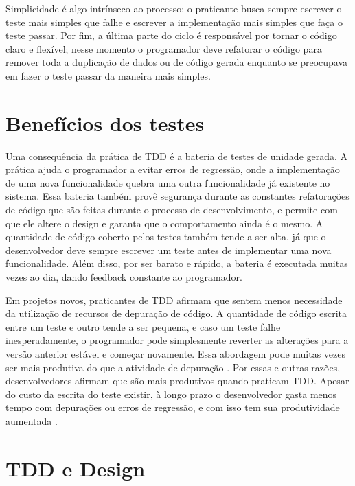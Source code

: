Simplicidade é algo intrínseco ao processo; o praticante
busca sempre escrever o teste mais simples que falhe e escrever a implementação mais simples
que faça o teste passar. Por fim, a última parte do ciclo é responsável por
tornar o código claro e flexível; nesse momento o programador deve
refatorar o código para remover toda a duplicação de dados ou de código gerada enquanto 
se preocupava em fazer o teste passar da maneira mais simples.

\section{Benefícios dos testes}

Uma consequência da prática de TDD é a bateria de testes de unidade gerada.
A prática ajuda o programador a evitar erros de regressão, onde a implementação de
uma nova funcionalidade quebra uma outra funcionalidade já existente no sistema.
Essa bateria também provê segurança durante as
constantes refatorações de código que são feitas durante o processo de
desenvolvimento, e permite com que ele altere o design e garanta que o
comportamento ainda é o mesmo. 
A quantidade de código coberto pelos testes também tende a ser alta, já que o
desenvolvedor deve sempre escrever um teste antes de implementar uma nova
funcionalidade. Além disso, por ser barato e rápido, a bateria é executada
muitas vezes ao dia, dando feedback constante ao programador.

Em projetos novos, praticantes de TDD afirmam que sentem menos necessidade da
utilização de recursos de depuração de código. A quantidade de código
escrita entre um teste e outro tende a ser pequena, e caso um teste falhe
inesperadamente, o programador pode simplesmente reverter as alterações para a 
versão anterior estável e começar novamente. Essa abordagem pode muitas vezes
ser mais produtiva do que a atividade de depuração 
\cite{janzen-arch-improvement}. Por essas e outras razões, desenvolvedores afirmam 
que são mais produtivos quando praticam TDD. Apesar do custo da escrita do teste
existir, à longo prazo o desenvolvedor gasta menos tempo com depurações ou 
erros de regressão, e com isso tem sua produtividade aumentada
\cite{george-e-williams}.

\section{TDD e Design}
\label{cap:tdd-e-design}

